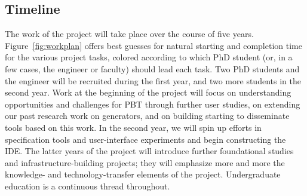 \subsection*{Timeline}

The work of the project will take place over the course of five years.
Figure~\ref{fig:workplan} offers best guesses for natural starting and
completion time for the various project tasks, colored according to
which PhD student (or, in a few cases, the engineer or faculty) should
lead each task.
%
Two PhD students and the engineer will be recruited during the first
year, and two more students in the second year.  Work at the beginning
of the project will focus on understanding
opportunities and challenges for PBT through further user studies,
on extending
our past research work on generators, and on building starting to
disseminate tools based on this work.  In the second year,
we will spin up efforts in specification tools and user-interface
experiments and begin constructing the \tyche{} IDE.  The latter years
of the project will introduce further foundational studies and
infrastructure-building projects; they will emphasize more and more the
knowledge- and technology-transfer elements of the project.
Undergraduate education is a continuous thread throughout.




